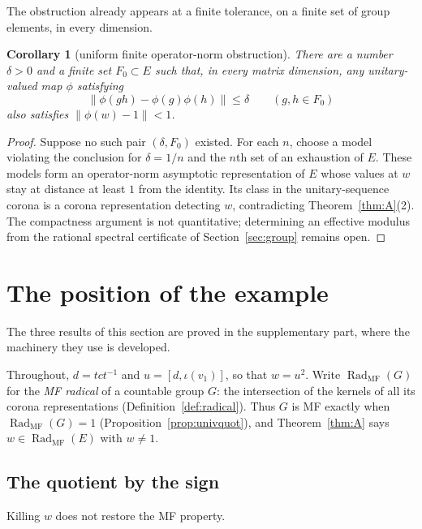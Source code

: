 \documentclass[11pt]{amsart}
\newcommand{\leanverified}[2]{\ignorespaces}
\newtheorem{corollary}[theorem]{Corollary}
\theoremstyle{definition}
\theoremstyle{remark}
\theoremstyle{plain}
\newcommand{\opnorm}[1]{\left\lVert #1\right\rVert}
\begin{document}
The obstruction already appears at a finite tolerance, on a finite set
of group elements, in every dimension.

\begin{corollary}[uniform finite operator-norm obstruction]\label{cor:uniform}
There are a number $\delta>0$ and a finite set $F_0\subset E$ such that,
in every matrix dimension, any unitary-valued map $\phi$ satisfying
\[
 \opnorm{\phi(gh)-\phi(g)\phi(h)}\leq\delta
 \qquad(g,h\in F_0)
\]
also satisfies $\opnorm{\phi(w)-1}<1$.
\leanverified{Sofic/LiteralUniformObstruction}{GroupApproximation.LiteralUniformObstruction.literal_uniform_operatorNorm_obstruction}
\end{corollary}

\begin{proof}
Suppose no such pair $(\delta,F_0)$ existed.  For each $n$, choose a
model violating the conclusion for $\delta=1/n$ and the $n$th set of an
exhaustion of $E$.  These models form an operator-norm asymptotic
representation of $E$ whose values at $w$ stay at distance at least $1$
from the identity.  Its class in the unitary-sequence corona is a
corona representation detecting $w$, contradicting
Theorem~\ref{thm:A}(2).  The compactness argument is not quantitative;
determining an effective modulus from the rational spectral
certificate of Section~\ref{sec:group} remains open.
\end{proof}

\section{The position of the example}\label{sec:position}

The three results of this section are proved in the supplementary
part, where the machinery they use is developed.

Throughout, $d=tct^{-1}$ and $u=[d,\iota(v_1)]$, so that $w=u^2$.
Write $\operatorname{Rad}_{\mathrm{MF}}(G)$ for the \emph{MF radical}
of a countable group $G$: the intersection of the kernels of all its
corona representations (Definition~\ref{def:radical}).  Thus $G$ is MF
exactly when $\operatorname{Rad}_{\mathrm{MF}}(G)=1$
(Proposition~\ref{prop:univquot}), and Theorem~\ref{thm:A} says
$w\in\operatorname{Rad}_{\mathrm{MF}}(E)$ with $w\ne1$.

\subsection*{The quotient by the sign}
Killing $w$ does not restore the MF property.
\end{document}
